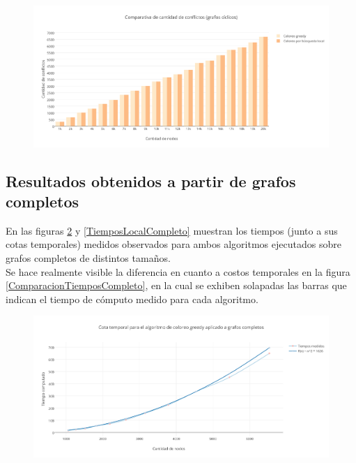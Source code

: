  \begin{figure}[H]
    \centering
  	\includegraphics[width=18cm]{imagenes/Ej5/ComparacionConflictosCiclico.png}
    \caption{}
 	  \label{ComparacionConflictosCiclico}
  \end{figure}


\subsection {Resultados obtenidos a partir de grafos completos}

En las figuras \ref{TiempoGreedyCompleto} y \ref{TiemposLocalCompleto} muestran los tiempos (junto a sus cotas temporales) medidos observados para ambos algoritmos ejecutados sobre grafos completos de distintos tamaños.\\
Se hace realmente visible la diferencia en cuanto a costos temporales en la figura \ref{ComparacionTiemposCompleto}, en la cual se exhiben solapadas las barras que indican el tiempo de cómputo medido para cada algoritmo.

 \begin{figure}[H]
    \centering
  	\includegraphics[width=18cm]{imagenes/Ej5/TiempoGreedyCompleto.png}
    \caption{}
 	  \label{TiempoGreedyCompleto}
  \end{figure}

